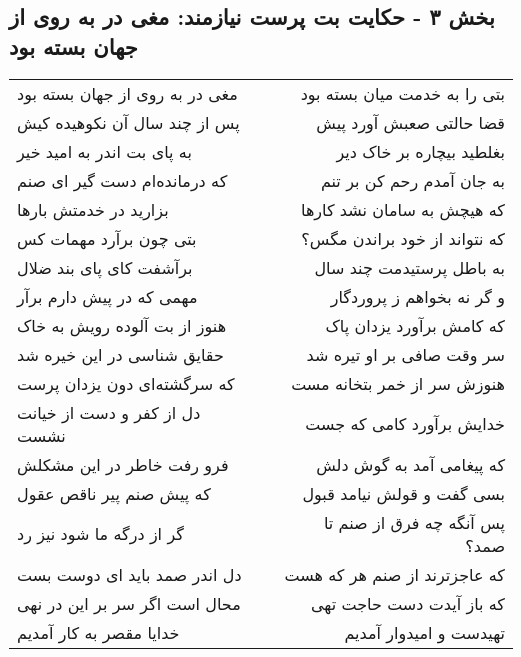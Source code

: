 \begin{center}
\section*{بخش ۳ - حکایت بت پرست نیازمند: مغی در به روی از جهان بسته بود}
\label{sec:003}
\begin{longtable}{l p{0.5cm} r}
مغی در به روی از جهان بسته بود
&&
بتی را به خدمت میان بسته بود
\\
پس از چند سال آن نکوهیده کیش
&&
قضا حالتی صعبش آورد پیش
\\
به پای بت اندر به امید خیر
&&
بغلطید بیچاره بر خاک دیر
\\
که درمانده‌ام دست گیر ای صنم
&&
به جان آمدم رحم کن بر تنم
\\
بزارید در خدمتش بارها
&&
که هیچش به سامان نشد کارها
\\
بتی چون برآرد مهمات کس
&&
که نتواند از خود براندن مگس؟
\\
برآشفت کای پای بند ضلال
&&
به باطل پرستیدمت چند سال
\\
مهمی که در پیش دارم برآر
&&
و گر نه بخواهم ز پروردگار
\\
هنوز از بت آلوده رویش به خاک
&&
که کامش برآورد یزدان پاک
\\
حقایق شناسی در این خیره شد
&&
سر وقت صافی بر او تیره شد
\\
که سرگشته‌ای دون یزدان پرست
&&
هنوزش سر از خمر بتخانه مست
\\
دل از کفر و دست از خیانت نشست
&&
خدایش برآورد کامی که جست
\\
فرو رفت خاطر در این مشکلش
&&
که پیغامی آمد به گوش دلش
\\
که پیش صنم پیر ناقص عقول
&&
بسی گفت و قولش نیامد قبول
\\
گر از درگه ما شود نیز رد
&&
پس آنگه چه فرق از صنم تا صمد؟
\\
دل اندر صمد باید ای دوست بست
&&
که عاجزترند از صنم هر که هست
\\
محال است اگر سر بر این در نهی
&&
که باز آیدت دست حاجت تهی
\\
خدایا مقصر به کار آمدیم
&&
تهیدست و امیدوار آمدیم
\\
\end{longtable}
\end{center}
